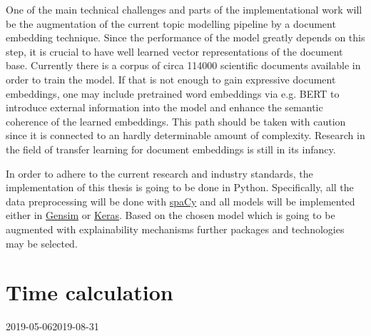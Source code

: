 \documentclass[pdftex,a4paper,12pt]{scrartcl}
\begin{document}
One of the main technical challenges and parts of the implementational work will be the augmentation of the current topic modelling pipeline by a document embedding technique. Since the performance of the model greatly depends on this step, it is crucial to have well learned vector representations of the document base. Currently there is a corpus of circa 114000 scientific documents available in order to train the model. If that is not enough to gain expressive document embeddings, one may include pretrained word embeddings via e.g. BERT \cite{devlinBERTPretrainingDeep2018} to introduce external information into the model and enhance the semantic coherence of the learned embeddings. This path should be taken with caution since it is connected to an hardly determinable amount of complexity. Research in the field of transfer learning for document embeddings is still in its infancy.

In order to adhere to the current research and industry standards, the implementation of this thesis is going to be done in Python. Specifically, all the data preprocessing will be done with \href{https://spacy.io/}{spaCy} and all models will be  implemented either in \href{https://radimrehurek.com/gensim/}{Gensim} or \href{https://keras.io/}{Keras}. Based on the chosen model which is going to be augmented with explainability mechanisms further packages and technologies may be selected.

\section{Time calculation}

\begin{ganttchart}[
	hgrid,
	vgrid={*{6}{draw=none}, dotted},
	x unit=0.115cm,
	expand chart=\textwidth,
	time slot format=isodate,
	calendar week text = {\currentweek{}},
	milestone left shift =-1,
	milestone right shift =2,
	chart element start border=right,
	link bulge = 1.3,
	link/.style={-to, rounded corners = 3pt}
	]{2019-05-06}{2019-08-31}
	 \\
	 \\
	 \\
	 \\
	 \\
	  \\
	 \\
\end{ganttchart}


\newpage
{}
{}   %
\end{document}
